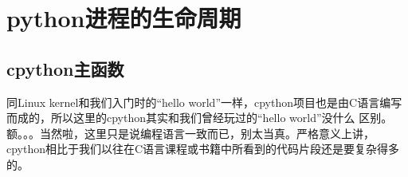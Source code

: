 \documentclass[UTF8]{book}
\begin{document}
\tableofcontents
\chapter{python进程的生命周期}
\section{cpython主函数}
同Linux kernel和我们入门时的“hello world”一样，cpython项目也是由C语言编写而成的，所以这里的cpython其实和我们曾经玩过的“hello world”没什么
区别。额。。。当然啦，这里只是说编程语言一致而已，别太当真。严格意义上讲，cpython相比于我们以往在C语言课程或书籍中所看到的代码片段还是要复杂得多的。
\end{document}
